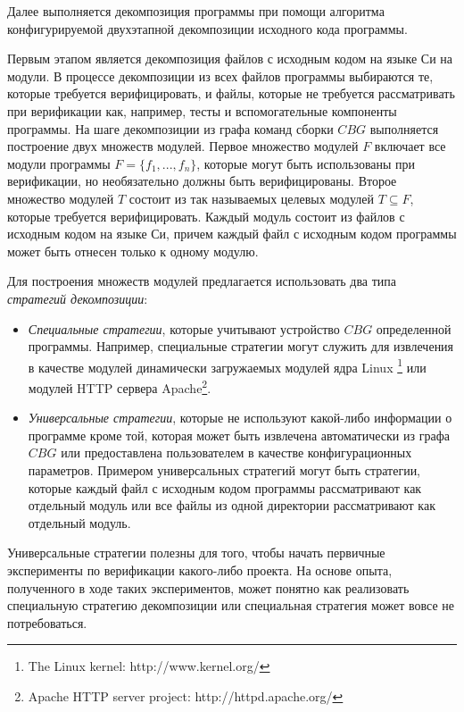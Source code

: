 \documentclass[%
candidate,     %
href,        %
colorlinks,  %
]{disser}
\begin{document}
Далее выполняется декомпозиция программы при помощи алгоритма конфигурируемой двухэтапной декомпозиции исходного кода программы.

Первым этапом является декомпозиция файлов с исходным кодом на языке Си на модули.
В процессе декомпозиции из всех файлов программы выбираются те, которые требуется верифицировать, и файлы, которые не требуется рассматривать при верификации как, например, тесты и вспомогательные компоненты программы.
На шаге декомпозиции из графа команд сборки $CBG$ выполняется построение двух множеств модулей.
Первое множество модулей $F$ включает все модули программы $F =  \{f_1, ..., f_n\}$, которые могут быть использованы при верификации, но необязательно должны быть верифицированы.
Второе множество модулей $T$ состоит из так называемых целевых модулей $T \subseteq F$, которые требуется верифицировать.
Каждый модуль состоит из файлов с исходным кодом на языке Си, причем каждый файл с исходным кодом программы может быть отнесен только к одному модулю.

Для построения множеств модулей предлагается использовать два типа \textit{стратегий декомпозиции}:
\begin{itemize}
    \item \textit{Специальные стратегии}, которые учитывают устройство $CBG$ определенной программы. 
    Например, специальные стратегии могут служить для извлечения в качестве модулей динамически загружаемых модулей ядра Linux \footnote{The Linux kernel: http://www.kernel.org/} или модулей HTTP сервера Apache\footnote{Apache HTTP server project: http://httpd.apache.org/}.
    \item \textit{Универсальные стратегии}, которые не используют какой-либо информации о программе кроме той, которая может быть извлечена автоматически из графа $CBG$ или предоставлена пользователем в качестве конфигурационных параметров. 
    Примером универсальных стратегий могут быть стратегии, которые каждый файл с исходным кодом программы рассматривают как отдельный модуль или все файлы из одной директории рассматривают как отдельный модуль.
\end{itemize}

Универсальные стратегии полезны для того, чтобы начать первичные эксперименты по верификации какого-либо проекта.
На основе опыта, полученного в ходе таких экспериментов, может понятно как реализовать специальную стратегию декомпозиции или специальная стратегия может вовсе не потребоваться.
\end{document}
